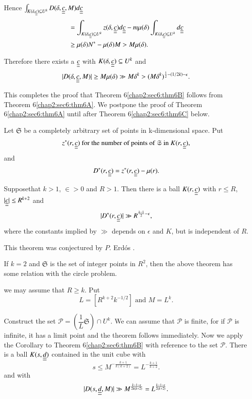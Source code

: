 Hence $\int_{K(\delta, \underline{\underline{c}}) \subseteq U^{k}} D(\delta, \underline{\underline{c}}, M) d\underline{\underline{c}}$
\begin{align*}
& = \int_{K(\delta, \underline{\underline{c}}) \subseteq U^{k}} z(\delta, \underline{\underline{c}}) d\underline{\underline{c}} - m\mu(\delta) \int_{K(\delta, \underline{\underline{c}}) \subseteq U^{k}} d\underline{\underline{c}}\\
& \geq \mu(\delta) N^{*} - \mu(\delta) M > M\mu(\delta).
\end{align*}

Therefore there exists a $\underline{\underline{c}}$ with $K(\delta, \underline{\underline{c}}) \subseteq U^{k}$ and
\begin{equation*}
|D(\delta, \underline{\underline{c}}, M)| \geq M\mu(\delta) \gg M\delta^{k} > (M\delta^{k})^{\frac{1}{2} - (1/2k)- \epsilon}.
\end{equation*}

This completes the proof that Theorem 6\ref{chap2:sec6:thm6B} follows from Theorem 6\ref{chap2:sec6:thm6A}. We postpone the proof of Theorem 6\ref{chap2:sec6:thm6A} until after Theorem 6\ref{chap2:sec6:thm6C} below.

Let $\mathfrak{S}$ be a completely arbitrary set of points in k-dimensional space. Put
$$
z^{*}(r, \underline{\underline{c}}) \text{ for the number of points of } \mathfrak{S} \text{ in } K(r, \underline{\underline{c}}),
$$
and
$$
D^{*} (r, \underline{\underline{c}}) = z^{*} (r, \underline{\underline{c}}) - \mu(r).
$$

\begin{theorem}\label{chap2:sec6:thm6C}
  Suppose\pageoriginale that $k > 1$, $\in > 0$ and $R > 1$. Then there is a ball $K(r, \underline{\underline{c}})$ with $r \leq R$, $|\underline{\underline{c}}| \leq R^{k+2}$ and 
  \begin{equation*}
    |D^{*} (r, \underline{\underline{c}})| \gg R^{\frac{k-1}{2} - \epsilon} ,
  \end{equation*}
  where the constants implied by $\gg$ depends on $\epsilon$ and $K$, but is independent of $R$.
  
  This theorem was conjectured by $P$. Erd\'{o}s \cite{5}.
\end{theorem}

\begin{remark*}
If $k = 2$ and $\mathfrak{S}$ is the set of integer points in $R^{2}$, then the above theorem has some relation with the circle problem.
\end{remark*}

 we may assume that $R \geq k$. Put
$$
L = \left[R^{k+2} k^{-1/2}\right] \text{ and } M = L^{k}.
$$

Construct the set $\mathscr{P} = \left(\dfrac{1}{L} \mathfrak{S}\right) \cap U^{k}$. We can assume that $\mathscr{P}$ is finite, for if $\mathscr{P}$ is infinite, it has a limit point and the theorem follows immediately. Now we apply the Corollary to Theorem 6\ref{chap2:sec6:thm6B} with reference to the set $\mathscr{P}$. There is a ball $K(s, \underline{\underline{d}})$ contained in the unit cube with
\begin{equation*}
s \leq M^{-\frac{k+1}{k(k+2)}} = L^{-\frac{k+1}{k+2}}.
\end{equation*}
and with
\begin{equation*}
|D(s, \underline{\underline{d}}, M)| \gg M^{\frac{k-1-\epsilon}{2k(k+2)}} = L^{\frac{k-1-\epsilon}{2(k+2)}}.
\end{equation*}


